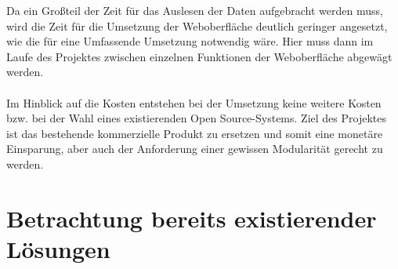 Da ein Großteil der Zeit für das Auslesen der Daten aufgebracht werden muss, wird die Zeit für die Umsetzung der Weboberfläche deutlich geringer angesetzt, wie die für eine Umfassende Umsetzung notwendig wäre.
Hier muss dann im Laufe des Projektes zwischen einzelnen Funktionen der Weboberfläche abgewägt werden.\\\\
Im Hinblick auf die Kosten entstehen bei der Umsetzung keine weitere Kosten bzw. bei der Wahl eines existierenden Open Source-Systems.
Ziel des Projektes ist das bestehende kommerzielle Produkt zu ersetzen und somit eine monetäre Einsparung, aber auch der Anforderung einer gewissen Modularität gerecht zu werden.\\

\section{Betrachtung bereits existierender Lösungen}
\label{sec:exitloesungen}

